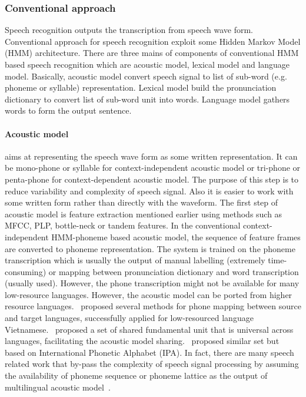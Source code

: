 \documentclass[12pt,twoside,final,hidelinks]{ltthesis}
\theoremstyle{definition}
\begin{document}
\subsubsection{Conventional approach}
Speech recognition outputs the transcription from speech wave form. Conventional approach for speech recognition exploit some Hidden Markov Model (HMM) architecture. 
There are three mains of components of conventional HMM based speech recognition which are acoustic model, lexical model and language model. Basically, acoustic model convert speech signal to list of sub-word (e.g. phoneme or syllable) representation. Lexical model build the pronunciation dictionary to convert list of sub-word unit into words. Language model gathers words to form the output sentence. 

\paragraph{Acoustic model} aims at representing the speech wave form as some written representation. It can be mono-phone or syllable for context-independent 
acoustic model or tri-phone or penta-phone for context-dependent acoustic model. The purpose of this step is to reduce variability and complexity of speech signal. 
Also it is easier to work with some written form rather than directly with the waveform. The first step of acoustic model is feature extraction mentioned earlier 
using methods such as MFCC, PLP, bottle-neck or tandem features. In the conventional context-independent HMM-phoneme based acoustic model, the sequence of feature 
frames are converted to phoneme representation. The system is trained on the phoneme transcription which is usually the 
output of manual labelling (extremely time-consuming) or mapping between pronunciation dictionary and word transcription (usually used). However, the phone 
transcription might not be available for many low-resource languages. However, the acoustic model can be ported from higher resource languages.~ 
proposed several methods for phone mapping between source and target languages, successfully applied for low-resourced language 
Vietnamese.~ proposed a set of shared fundamental unit that is universal across languages, facilitating the acoustic model 
sharing.~ proposed similar set but based on International Phonetic Alphabet (IPA). In fact, there are many speech related work that 
by-pass the complexity of speech signal processing by assuming the availability of phoneme sequence or phoneme lattice as the output of 
multilingual acoustic model~\cite{stahlberg2012word,adams-EtAl:2016:EMNLP2016}.
\end{document}
